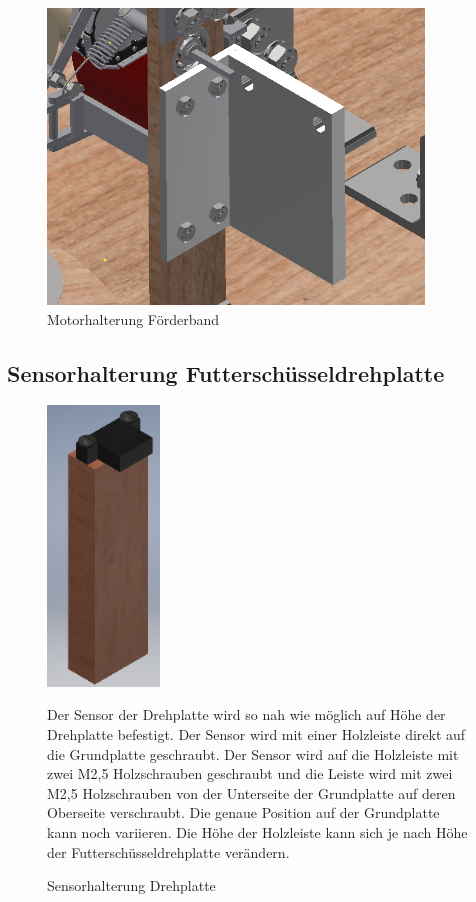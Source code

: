 \begin{figure}[H] 
\begin{center}

\includegraphics[width=10cm]{Bilder/Inventor/Motorhalterung_Foerderband}
\caption{Motorhalterung Förderband}
\label{Motor_mount_foerd}

\end{center}
\end{figure}
\subsection{Sensorhalterung Futterschüsseldrehplatte}

\begin{figure}[H]
\begin{minipage}[t]{6cm}
\vspace{0pt}
\centering
\includegraphics[width=3cm]{Bilder/Inventor/Sensorhalterung_Drehplatte}
\caption{Sensorhalterung Drehplatte}
\label{Sens_Dreh}
\end{minipage}
\hfill
\begin{minipage}[t]{12cm}
\vspace{0pt}
Der Sensor der Drehplatte wird so nah wie möglich auf Höhe der Drehplatte befestigt. Der Sensor wird mit einer Holzleiste direkt auf die Grundplatte geschraubt. Der Sensor wird auf die Holzleiste mit zwei M2,5 Holzschrauben geschraubt und die Leiste wird mit zwei M2,5 Holzschrauben von der Unterseite der Grundplatte auf deren Oberseite verschraubt. Die genaue Position auf der Grundplatte kann noch variieren. Die Höhe der Holzleiste kann sich je nach Höhe der Futterschüsseldrehplatte verändern.
\end{minipage}
\end{figure}
